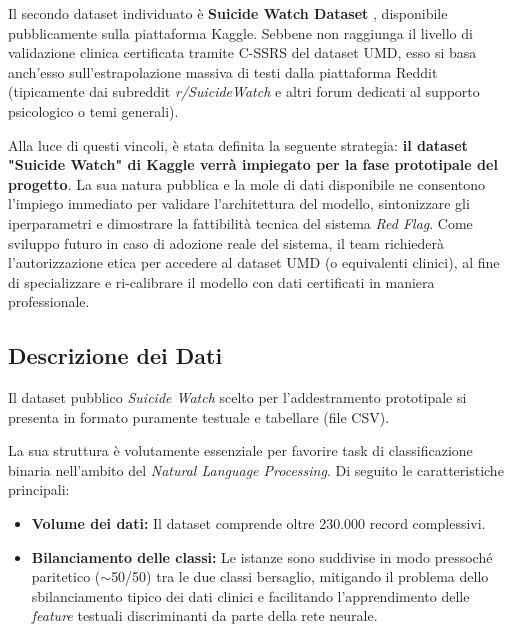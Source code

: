 Il secondo dataset individuato è \textbf{Suicide Watch Dataset} \cite{suicide_watch_dataset}, disponibile pubblicamente sulla piattaforma Kaggle. Sebbene non raggiunga il livello di validazione clinica certificata tramite C-SSRS del dataset UMD, esso si basa anch'esso sull'estrapolazione massiva di testi dalla piattaforma Reddit (tipicamente dai subreddit \textit{r/SuicideWatch} e altri forum dedicati al supporto psicologico o temi generali). 

Alla luce di questi vincoli, è stata definita la seguente strategia: \textbf{il dataset "Suicide Watch" di Kaggle verrà impiegato per la fase prototipale del progetto}. La sua natura pubblica e la mole di dati disponibile ne consentono l'impiego immediato per validare l'architettura del modello, sintonizzare gli iperparametri e dimostrare la fattibilità tecnica del sistema \textit{Red Flag}. Come sviluppo futuro in caso di adozione reale del sistema, il team richiederà l'autorizzazione etica per accedere al dataset UMD (o equivalenti clinici), al fine di specializzare e ri-calibrare il modello con dati certificati in maniera professionale.

\subsection{Descrizione dei Dati}
\label{subsec:descrizione_red_flag}

Il dataset pubblico \textit{Suicide Watch} scelto per l'addestramento prototipale si presenta in formato puramente testuale e tabellare (file CSV). 

La sua struttura è volutamente essenziale per favorire task di classificazione binaria nell'ambito del \textit{Natural Language Processing}. Di seguito le caratteristiche principali:

\begin{itemize}
    \item \textbf{Volume dei dati:} Il dataset comprende oltre 230.000 record complessivi.
    \item \textbf{Bilanciamento delle classi:} Le istanze sono suddivise in modo pressoché paritetico ($\sim$50/50) tra le due classi bersaglio, mitigando il problema dello sbilanciamento tipico dei dati clinici e facilitando l'apprendimento delle \textit{feature} testuali discriminanti da parte della rete neurale.
\end{itemize}

